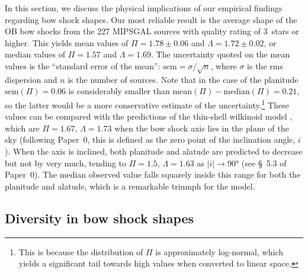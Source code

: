\documentclass[useAMS, usenatbib, a4paper]{mnras}
\providecommand{\abs}[1]{\lvert#1\rvert}
\begin{document}
In this section, we discuss the physical implications of our empirical
findings regarding bow shock shapes.  Our most reliable result is the
average shape of the OB bow shocks from the 227 MIPSGAL sources with
quality rating of 3~stars or higher.  This yields mean values of
\(\Pi = 1.78 \pm 0.06\) and \(\Lambda = 1.72 \pm 0.02\), or median values of
\(\Pi = 1.57\) and \(\Lambda = 1.69\).  The uncertainty quoted on the mean
values is the ``standard error of the mean'':
\(\text{sem} = \sigma / \sqrt{n}\), where \(\sigma\) is the rms dispersion and
\(n\) is the number of sources.  Note that in the case of the
planitude \(\text{sem}(\Pi) = 0.06\) is considerably smaller than
\(\text{mean}(\Pi) - \text{median}(\Pi) = 0.21\), so the latter would be a
more conservative estimate of the uncertainty.\footnote{This is
  because the distribution of \(\Pi\) is approximately log-normal, which
  yields a significant tail towards high values when converted to
  linear space.}  These values can be compared with the predictions of
the thin-shell wilkinoid model \citep{Wilkin:1996a}, which are
\(\Pi = 1.67\), \(\Lambda = 1.73\) when the bow shock axis lies in the plane
of the sky (following Paper~0, this is defined as the zero point of
the inclination angle, \(i\)).  When the axis is inclined, both
planitude and alatude are predicted to decrease but not by very much,
tending to \(\Pi = 1.5\), \(\Lambda = 1.63\) as
\(\abs{i} \to \ang{90}\) (see \S~5.3 of Paper~0).  The median observed
value falls squarely inside this range for both the planitude and
alatude, which is a remarkable triumph for the \citet{Wilkin:1996a}
model.

\subsection{Diversity in bow shock shapes}
\label{sec:diversity-bow-shock}
\end{document}
